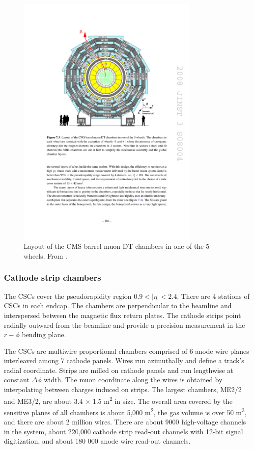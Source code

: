 \begin{figure}[hbtp]
\centering
\includegraphics[width=0.8\textwidth]{figures/cms_drifttubes_slice.pdf}
\caption{ Layout of the CMS barrel muon DT chambers in one of the 5 wheels. From \cite{Chatrchyan:2008aa}.}
\label{fig:dt_barrel}
\end{figure}

\subsubsection{Cathode strip chambers}
The CSCs cover the pseudorapidity region $0.9<|\eta|<2.4$.
There are 4 stations of CSCs in each endcap.
The chambers are perpendicular to the beamline and interspersed between the magnetic flux return plates.
The cathode strips point radially outward from the beamline and provide a precision measurement in the $r-\phi$ bending plane.

The CSCs are multiwire proportional chambers comprised of 6 anode wire planes interleaved
among 7 cathode panels. Wires run azimuthally and define a track’s radial coordinate.
Strips are milled on cathode panels and run lengthwise at constant $\Delta\phi$ width. 
The muon coordinate along the wires is obtained by interpolating between charges induced on strips.
The largest chambers, ME2/2 and ME3/2, are about 3.4 × 1.5 m\textsuperscript{2} in size.
The overall area covered by the sensitive planes of all chambers is about 5,000 m\textsuperscript{2},
the gas volume is over 50 m\textsuperscript{3}, and there are about 2 million wires.
There are about 9000 high-voltage channels in the system, 
about 220,000 cathode strip read-out channels with 12-bit signal digitization,
and about 180 000 anode wire read-out channels.


